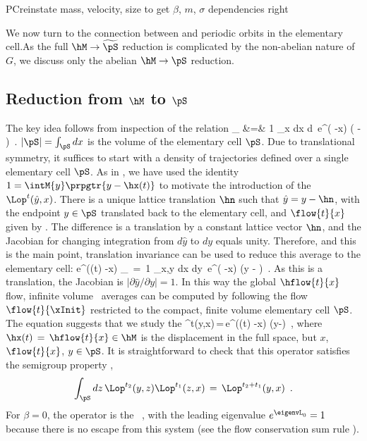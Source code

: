 PC{reinstate mass, velocity, size to get $\beta$, $m$, $\sigma$
    dependencies right}

We now turn to the connection between  and periodic
orbits in the elementary cell.As the full $\hM \rightarrow {\widetilde
\pS}$ reduction is complicated by the non-abelian nature of $G$, we
discuss only the abelian $\hM \rightarrow \pS$ reduction.


\subsection{Reduction from $\hM$ to $\pS$}
\label{s-Red-hMto-pS}

The key idea follows from inspection of the relation
\bea
{}_\pS
&=& {1 \over {|\pS|}} \int_{x \in \pS \atop {} \in \hM}
dx d\,
e^{\beta \cdot ( -x) }
\delta( - )~.
\nnu
\eea
 ${|\pS|=\int_\pS dx}$ is the volume of the elementary cell $\pS$.
Due to translational symmetry, it suffices to start with a density of
trajectories defined over a single elementary cell $\pS$.
As in , we have used the identity $ 1 = \intM{y}
\prpgtr{y - \hx(t)}$ to motivate the introduction of the {\evOper} $
\Lop^t(\hat{y},x)$.  There is a unique lattice translation $\hn$ such
that $\hat{y}=y - \hn$, with the endpoint $y \in \pS$ translated back
to the elementary cell, and $\flow{t}{x}$ given by
. The difference is a translation by a constant
lattice vector $\hn$, and the Jacobian for changing integration from
$d\hat{y}$ to $dy$ equals unity.  Therefore, and this is the main
point, translation invariance can be used to reduce this average to
the elementary cell:
\beq
\langle e^{\beta \cdot (\hx(t) -x) } \rangle_\pS
\,=\, {1 \over {|\pS|}} \int_{x,y \in \pS} dx dy\,
e^{\beta \cdot ( -x) }
\delta(y - )~.
As this is a translation, the Jacobian is $|\partial \hat{y}/\partial
y| = 1$.  In this way the global $\hflow{t}{x}$ flow, infinite volume
\statesp\ averages can be computed by following the flow
$\flow{t}{\xInit}$ restricted to the compact, finite volume elementary
cell $\pS$.  The equation  suggests that we study
the
\evOper
\beq
\Lop^t(y,x)\,=\,e^{\beta \cdot (\hx(t) -x) } \delta(y-)
\,,
where $\hx(t)\,=\,\hflow{t}{x} \in \hM$ is the displacement in the
full space, but $x$, $\flow{t}{x}$, $y \in \pS$.  It is
straightforward to check that this operator satisfies the semigroup
property ,
\[
\int_{\pS} dz\,
\Lop^{t_2}(y,z) \Lop^{t_1}(z,x) \,=\,
\Lop^{t_2+t_1}(y,x)~
\,.
\]
For $\beta=0$, the operator  is the \FPoper\
, with the leading eigenvalue $e^{\eigenvL_0}=1$
because there is no escape from this system (see the flow conservation
sum rule \refeq{prob-cons}).

